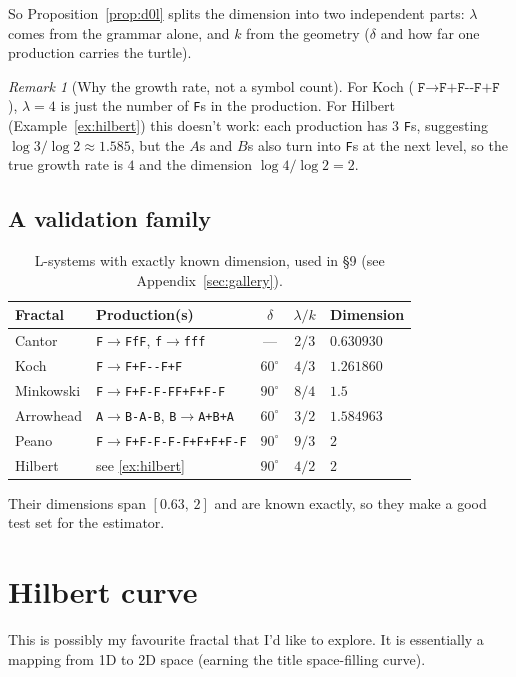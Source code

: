 \documentclass[11pt, a4paper]{article}
\theoremstyle{plain}
\theoremstyle{definition}
\theoremstyle{remark}
\newtheorem{remark}[theorem]{Remark}
\begin{document}
So Proposition~\ref{prop:d0l} splits the dimension into two independent parts:
$\lambda$ comes from the grammar alone, and $k$ from the geometry ($\delta$ and how far one production carries the turtle).

\begin{remark}[Why the growth rate, not a symbol count]
    For Koch ($\texttt{F}\to\texttt{F+F-{}-F+F}$), $\lambda=4$ is just the
    number of \texttt{F}s in the production. For Hilbert
    (Example~\ref{ex:hilbert}) this doesn't work: each production has 3
    \texttt{F}s, suggesting $\log3/\log2\approx1.585$, but the $A$s and $B$s
    also turn into \texttt{F}s at the next level, so the true growth rate is
    $4$ and the dimension $\log4/\log2=2$.
\end{remark}

\subsection{A validation family}
\begin{table}[h]
\centering
\begin{tabular}{llccl}
\hline
Fractal & Production(s) & $\delta$ & $\lambda/k$ & Dimension \\
\hline
Cantor & \texttt{F}$\to$\texttt{FfF}, \texttt{f}$\to$\texttt{fff}
    & --- & $2/3$ & $0.630930$ \\
Koch & \texttt{F}$\to$\texttt{F+F-{}-F+F}
    & $60^\circ$ & $4/3$ & $1.261860$ \\
Minkowski & \texttt{F}$\to$\texttt{F+F-F-FF+F+F-F}
    & $90^\circ$ & $8/4$ & $1.5$ \\
Arrowhead & \texttt{A}$\to$\texttt{B-A-B}, \texttt{B}$\to$\texttt{A+B+A}
    & $60^\circ$ & $3/2$ & $1.584963$ \\
Peano & \texttt{F}$\to$\texttt{F+F-F-F-F+F+F+F-F}
    & $90^\circ$ & $9/3$ & $2$ \\
Hilbert & see \ref{ex:hilbert}
    & $90^\circ$ & $4/2$ & $2$ \\
\hline
\end{tabular}
\caption{L-systems with exactly known dimension, used in \S9 (see Appendix~\ref{sec:gallery}).}
\label{tab:lsystems}
\end{table}

\noindent Their dimensions span $[0.63,\,2]$ and are known exactly, so they make a good test set for the estimator.
\newpage
\section{Hilbert curve}
This is possibly my favourite fractal that I'd like to explore. It is essentially a mapping from 1D to 2D space (earning the title space-filling curve).
\end{document}
